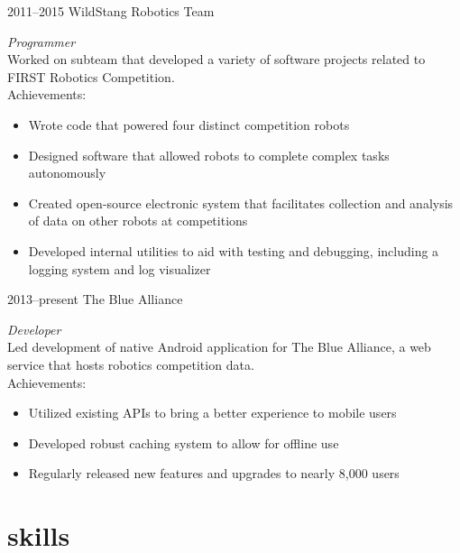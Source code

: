 \documentclass[]{resume}
\begin{document}
\begin{entrylist}


\entry
{2011--2015}
{WildStang Robotics Team}
{}
{\emph{Programmer} \\
Worked on subteam that developed a variety of software projects related to FIRST Robotics Competition. \\
Achievements:
\noindent\begin{itemize}[leftmargin=0.45cm]
\item Wrote code that powered four distinct competition robots
\item Designed software that allowed robots to complete complex tasks autonomously
\item Created open-source electronic system that facilitates collection and analysis of data on other robots at competitions
\item Developed internal utilities to aid with testing and debugging, including a logging system and log visualizer
\end{itemize}}


\entry
{2013--present}
{The Blue Alliance}
{}
{\emph{Developer} \\
Led development of native Android application for The Blue Alliance, a web service that hosts robotics competition data. \\
Achievements:
\noindent\begin{itemize}[leftmargin=0.45cm]
\item Utilized existing APIs to bring a better experience to mobile users
\item Developed robust caching system to allow for offline use
\item Regularly released new features and upgrades to nearly 8,000 users
\end{itemize}}

\end{entrylist}


\section{skills}
\end{document}

